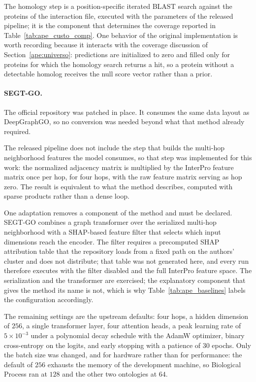 \documentclass[Ingles]{ic-tese-v3}
\begin{document}
\begin{appendices}{}
The homology step is a position-specific iterated BLAST search against the proteins of the
interaction file, executed with the parameters of the released pipeline; it is the component that
determines the coverage reported in Table~\ref{tab:ape_custo_comp}. One behavior of the original
implementation is worth recording because it interacts with the coverage discussion of
Section~\ref{ape:universo}: predictions are initialized to zero and filled only for proteins for
which the homology search returns a hit, so a protein without a detectable homolog receives the null
score vector rather than a prior.

\paragraph{SEGT-GO.} The official repository was patched in place. It consumes the same data layout
as DeepGraphGO, so no conversion was needed beyond what that method already required.

The released pipeline does not include the step that builds the multi-hop neighborhood features the
model consumes, so that step was implemented for this work: the normalized adjacency matrix is
multiplied by the InterPro feature matrix once per hop, for four hops, with the raw feature matrix
serving as hop zero. The result is equivalent to what the method describes, computed with sparse
products rather than a dense loop.

One adaptation removes a component of the method and must be declared. SEGT-GO combines a graph
transformer over the serialized multi-hop neighborhood with a SHAP-based feature filter that selects
which input dimensions reach the encoder. The filter requires a precomputed SHAP attribution table
that the repository loads from a fixed path on the authors' cluster and does not distribute; that
table was not generated here, and every run therefore executes with the filter disabled and the full
InterPro feature space. The serialization and the transformer are exercised; the explanatory
component that gives the method its name is not, which is why Table~\ref{tab:ape_baselines} labels
the configuration accordingly.

The remaining settings are the upstream defaults: four hops, a hidden dimension of $256$, a single
transformer layer, four attention heads, a peak learning rate of $5 \times 10^{-3}$ under a
polynomial decay schedule with the AdamW optimizer, binary cross-entropy on the logits, and early
stopping with a patience of $30$ epochs. Only the batch size was changed, and for hardware rather
than for performance: the default of $256$ exhausts the memory of the development machine, so
Biological Process ran at $128$ and the other two ontologies at $64$.


\end{appendices}
\end{document}
